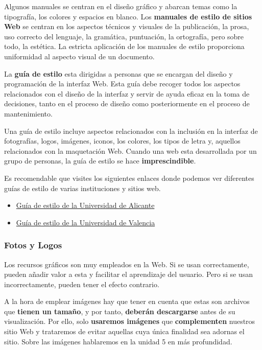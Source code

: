 Algunos manuales se centran en el diseño gráfico y abarcan temas como la tipografía, los colores y espacios en blanco. Los \textbf{manuales de estilo de sitios Web} se centran en los aspectos técnicos y visuales de la publicación, la prosa, uso correcto del lenguaje, la gramática, puntuación, la ortografía, pero sobre todo, la estética. La estricta aplicación de los manuales de estilo proporciona uniformidad al aspecto visual de un documento.

La \textbf{guía de estilo} esta dirigidas a personas que se encargan del diseño y programación de la interfaz Web. Esta guía debe recoger todos los aspectos relacionados con el diseño de la interfaz y servir de ayuda eficaz en la toma de decisiones, tanto en el proceso de diseño como posteriormente en el proceso de mantenimiento.

Una guía de estilo incluye aspectos relacionados con la inclusión en la interfaz de fotografías, logos, imágenes, iconos, los colores, los tipos de letra y, aquellos relacionados con la maquetación Web. Cuando una web esta desarrollada por un grupo de personas, la guía de estilo se hace \textbf{imprescindible}.

Es recomendable que visites los siguientes enlaces donde podemos ver diferentes guías de estilo de varias instituciones y sitios web.

\begin{itemize}
    \item \href{https://si.ua.es/es/web-institucional-ua/guia-de-estilo.html}{Guía de estilo de la Universidad de Alicante}
    \item \href{http://www.upv.es/entidades/ASIC/manuales/guia_estilos_upv.pdf}{Guía de estilo de la Universidad de Valencia}
\end{itemize}

\subsubsection{Fotos y Logos}
Los recursos gráficos son muy empleados en la Web. Si se usan correctamente, pueden añadir valor a esta y facilitar el aprendizaje del usuario. Pero si se usan incorrectamente, pueden tener el efecto contrario.

A la hora de emplear imágenes hay que tener en cuenta que estas son archivos que \textbf{tienen un tamaño}, y por tanto, \textbf{deberán descargarse} antes de su visualización. Por ello, solo \textbf{usaremos imágenes} que \textbf{complementen} nuestros sitio Web y trataremos de evitar aquellas cuya única finalidad sea adornas el sitio. Sobre las imágenes hablaremos en la unidad 5 en más profundidad.

